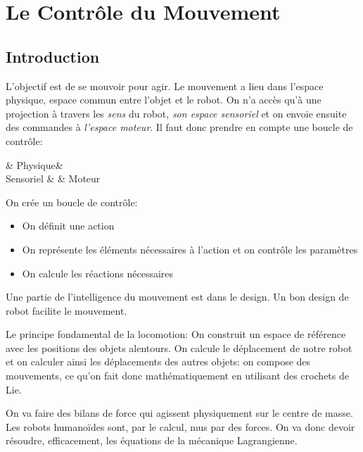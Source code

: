 \documentclass[math]{cours}
\begin{document}
\section{Le Contrôle du Mouvement}
\subsection{Introduction}
L'objectif est de se mouvoir pour agir.
Le mouvement a lieu dans l'espace physique, espace commun entre l'objet et le robot.
On n'a accès qu'à une projection à travers les \textit{sens} du robot, \emph{son espace sensoriel} et on envoie ensuite des commandes à \emph{l'espace moteur}.
Il faut donc prendre en compte une boucle de contrôle:
\begin{category}[]
	& Physique & \\
Sensoriel  & & Moteur
\end{category}

On crée un boucle de contrôle:
\begin{itemize}
	\item On définit une action
	\item On représente les éléments nécessaires à l'action et on contrôle les paramètres
	\item On calcule les réactions nécessaires
\end{itemize}
Une partie de l'intelligence du mouvement est dans le design.
Un bon design de robot facilite le mouvement.

Le principe fondamental de la locomotion:
On construit un espace de référence avec les positions des objets alentours.
On calcule le déplacement de notre robot et on calculer ainsi les déplacements des autres objets:
on compose des mouvements, ce qu'on fait donc mathématiquement en utilisant des crochets de Lie.

On va faire des bilans de force qui agissent physiquement sur le centre de masse.
Les robots humanoïdes sont, par le calcul, mus par des forces.
On va donc devoir résoudre, efficacement, les équations de la mécanique Lagrangienne.
\end{document}
